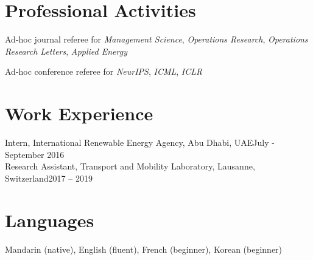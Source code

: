 \documentclass[letterpaper,11pt]{article}
\begin{document}
\section{Professional Activities}

\quad Ad-hoc journal referee for \emph{Management Science}, \emph{Operations Research}, \emph{Operations Research Letters}, \emph{Applied Energy}

\quad Ad-hoc conference referee for \emph{NeurIPS}, \emph{ICML}, \emph{ICLR}

\section{Work Experience}

\begin{itemize}[leftmargin=0.15in, label={}]
	{\item{
			{{Intern},  International Renewable Energy Agency, Abu Dhabi, UAE}{\hfill {July - September 2016\,\,}} \\
			{{Research Assistant},  Transport and Mobility Laboratory,  Lausanne, Switzerland}{\hfill {2017 -- 2019\,\,}} \\
			
	}}
\end{itemize}

\section{Languages}
\quad Mandarin ({native}), English ({fluent}), French ({beginner}),  Korean ({beginner})
\end{document}
